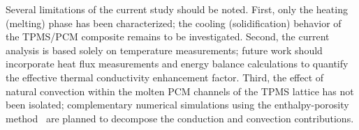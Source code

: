 Several limitations of the current study should be noted. First, only the heating (melting) phase has been characterized; the cooling (solidification) behavior of the TPMS/PCM composite remains to be investigated. Second, the current analysis is based solely on temperature measurements; future work should incorporate heat flux measurements and energy balance calculations to quantify the effective thermal conductivity enhancement factor. Third, the effect of natural convection within the molten PCM channels of the TPMS lattice has not been isolated; complementary numerical simulations using the enthalpy-porosity method~\cite{ebrahimi2019sensitivity} are planned to decompose the conduction and convection contributions.
